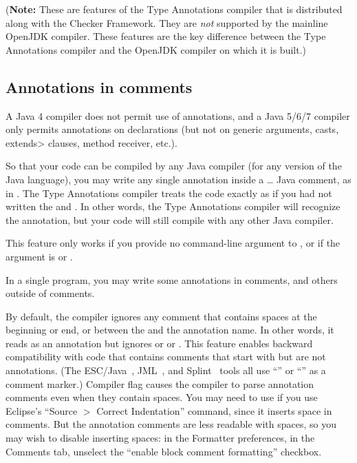 (\textbf{Note:} These are features of the Type Annotations compiler that is
distributed along with the Checker Framework.  They are \emph{not}
supported by the mainline OpenJDK compiler.  These features are the key
difference between the Type Annotations compiler and the OpenJDK compiler
on which it is built.)



\subsection{Annotations in comments\label{annotations-in-comments}}

A Java 4 compiler does not permit use of
annotations, and a Java 5/6/7 compiler only permits annotations on
declarations (but not on generic arguments, casts, \<extends> clauses, method receiver, etc.).

So that your code can be compiled by any Java compiler (for any version of
the Java language), you may write any single annotation inside a
\code{/*}\ldots\code{*/} Java comment, as in .
The Type Annotations compiler treats the code exactly as if you had not written the
\code{/*} and \code{*/}.
In other words, the Type Annotations compiler will recognize the
annotation, but your code will still compile with any other Java compiler.

This feature only works if you provide no  command-line
argument to , or if the  argument is 
or .

In a single program, you may write some annotations in comments, and others
outside of comments.

By default, the compiler ignores any comment that contains spaces at the
beginning or end, or between the  and the annotation name.
In other words, it reads  as an annotation but ignores
 or  or .
This
feature enables backward compatibility with code that contains comments
that start with  but are not annotations.  (The
ESC/Java~\cite{FlanaganLLNSS02}, JML~\cite{LeavensBR2006:JML}, and
Splint~\cite{Evans96} tools all use ``'' or ``'' as a
comment marker.)
Compiler flag
 causes the compiler to parse annotation comments
even when they contain spaces.  You may need to use
 if you use Eclipse's ``Source $>$ Correct
Indentation'' command, since it inserts space in comments.  But the
annotation comments are less readable with spaces, so you may wish to disable
inserting spaces:  in the Formatter preferences, in the Comments tab,
unselect the ``enable block comment formatting'' checkbox.


